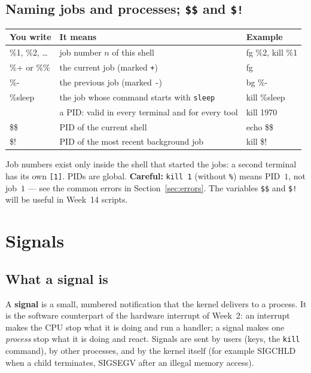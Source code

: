\documentclass[11pt,a4paper]{article}
\newcommand{\term}[1]{\textbf{\color{mintdeep}#1}}
\newcommand{\cmd}[1]{\texttt{#1}}
\begin{document}
\subsection{Naming jobs and processes; \texttt{\$\$} and \texttt{\$!}}

\begin{center}
\renewcommand{\arraystretch}{1.2}
\begin{tabularx}{\linewidth}{>{\ttfamily}l >{\raggedright\arraybackslash}X >{\ttfamily}l}
\toprule
\textbf{\rmfamily You write} & \textbf{It means} & \textbf{\rmfamily Example}\\
\midrule
\%1, \%2, \dots & job number $n$ of this shell & fg \%2, kill \%1\\
\%+ \textrm{or} \%\% & the current job (marked \texttt{+}) & fg\\
\%- & the previous job (marked \texttt{-}) & bg \%-\\
\%sleep & the job whose command starts with \texttt{sleep} & kill \%sleep\\
1970 & a PID: valid in every terminal and for every tool & kill 1970\\
\$\$ & PID of the current shell & echo \$\$\\
\$! & PID of the most recent background job & kill \$!\\
\bottomrule
\end{tabularx}
\end{center}

Job numbers exist only inside the shell that started the jobs: a second terminal has its own \texttt{[1]}. PIDs are global. \textbf{Careful:} \cmd{kill 1} (without \texttt{\%}) means PID~$1$, not job~$1$ --- see the common errors in Section~\ref{sec:errors}. The variables \verb|$$| and \verb|$!| will be useful in Week~14 scripts.

\section{Signals}
\label{sec:signals}

\subsection{What a signal is}

A \term{signal} is a small, numbered notification that the kernel delivers to a process. It is the software counterpart of the hardware interrupt of Week~2: an interrupt makes the CPU stop what it is doing and run a handler; a signal makes one \emph{process} stop what it is doing and react. Signals are sent by users (keys, the \cmd{kill} command), by other processes, and by the kernel itself (for example SIGCHLD when a child terminates, SIGSEGV after an illegal memory access).
\end{document}
